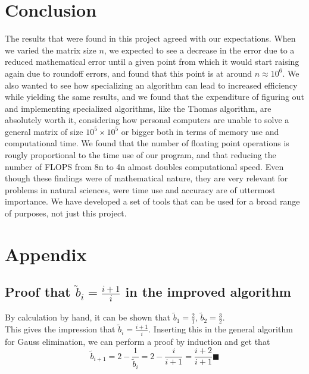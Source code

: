 \documentclass[10pt,a4paper]{article}
\begin{document}
\section{Conclusion}
The results that were found in this project agreed with our expectations. When we varied the matrix size $n$, we expected to see a decrease in the error due to a reduced mathematical error until a given point from which it would start raising again due to roundoff errors, and found that this point is at around $n \approx 10^6$. We also wanted to see how specializing an algorithm can lead to increased efficiency while yielding the same results, and we found that the expenditure of figuring out and implementing specialized algorithms, like the Thomas algorithm, are absolutely worth it, considering how personal computers are unable to solve a general matrix of size $10^5\times10^5$ or bigger both in terms of memory use and computational time. We found that the number of floating point operations is rougly proportional to the time use of our program, and that reducing the number of FLOPS from 8n to 4n almost doubles computational speed. Even though these findings were of mathematical nature, they are very relevant for problems in natural sciences, were time use and accuracy are of uttermost importance. We have developed a set of tools that can be used for a broad range of purposes, not just this project.
\section{Appendix}
\subsection{Proof that $\tilde{b}_i=\frac{i+1}{i}$ in the improved algorithm}
By calculation by hand, it can be shown that  $\tilde{b}_1=\frac{2}{1}$,  $\tilde{b}_2=\frac{3}{2}$.\\
This gives the impression that  $\tilde{b}_i=\frac{i+1}{i}$.
Inserting this in the general algorithm for Gauss elimination, we can perform a proof by induction and get that
 $$\tilde{b}_{i+1}=2-\frac{1}{\tilde{b}_{i}}=2-\frac{i}{i+1}=\frac{i+2}{i+1} \blacksquare$$
\end{document}

